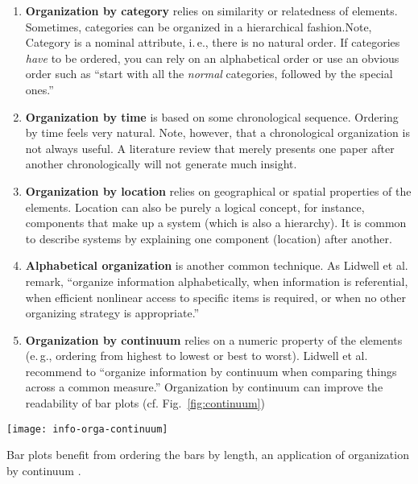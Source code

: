 \begin{enumerate}
\item \textbf{Organization by category} relies on similarity or relatedness of elements. Sometimes, categories can be organized in a hierarchical fashion.Note, Category is a nominal attribute, i.\,e., there is no natural order. If categories \emph{have} to be ordered, you can rely on an alphabetical order or use an obvious order such as ``start with all the \emph{normal} categories, followed by the special ones.''

\item \textbf{Organization by time} is based on some chronological sequence. Ordering by time feels very natural. Note, however, that a chronological organization is not always useful. A literature review that merely presents one paper after another chronologically will not generate much insight.

\item \textbf{Organization by location} relies on geographical or spatial properties of the elements. Location can also be purely a logical concept, for instance, components that make up a system (which is also a hierarchy). It is common to describe systems by explaining one component (location) after another.

\item \textbf{Alphabetical organization} is another common technique. As Lidwell et al. \cite{Lidwell10} remark, ``organize information alphabetically, when information is referential, when efficient nonlinear access to specific items is required, or when no other organizing strategy is appropriate.''

\item \textbf{Organization by continuum} relies on a numeric property of the elements (e.\,g., ordering from highest to lowest or best to worst). Lidwell et al. \cite{Lidwell10} recommend to ``organize information by continuum when comparing things across a common measure.'' Organization by continuum can improve the readability of bar plots (cf. Fig.~\ref{fig:continuum})
\end{enumerate}


\begin{marginfigure}
\centering
\texttt{[image: info-orga-continuum]}
\caption{\label{fig:continuum} Bar plots benefit from ordering the bars by length, an application of organization by continuum \cite{Lidwell10}.} 
\end{marginfigure}


